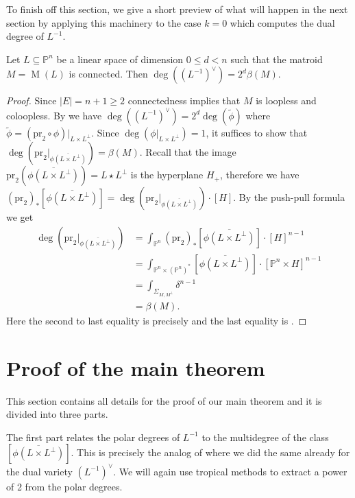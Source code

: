 \documentclass[12pt,a4paper,english]{scrartcl}
\newcommand{\PP}{\mathbb{P}}
\DeclareMathOperator{\Matroid}{M}
\begin{document}
To finish off this section, we give a short preview of what will happen in the next section by applying this machinery to the case $k=0$ which computes the dual degree of $L^{-1}$.
\begin{theorem}
\label{thm: dualdegrees}
    Let $L\subseteq \PP^n$ be a linear space of dimension $0\leq d<n$ such that the matroid $M=\Matroid(L)$ is connected. Then $\deg((L^{-1})^\vee)=2^d \beta(M)$.
\end{theorem}
\begin{proof}
    Since $|E|=n+1\geq 2$ connectedness implies that $M$ is loopless and coloopless.
    By  we have $\deg((L^{-1})^\vee)=2^d\deg(\widetilde{\phi})$ where $\widetilde{\phi}=(\text{pr}_2\circ \phi)|_{L\times L^\perp}$. Since $\deg (\phi|_{L\times L^\perp})=1$, it suffices to show that $\deg(\text{pr}_2|_{\overline{\phi(L\times L^\perp)}})=\beta(M)$. Recall that the image $\text{pr}_2(\overline{\phi(L\times L^\perp)})=L\star L^\perp$ is the hyperplane $H_+$, therefore we have $(\text{pr}_2)_*[\overline{\phi(L\times L^\perp)}]=\deg(\text{pr}_2|_{\overline{\phi(L\times L^\perp)}})\cdot[H]$. By the push-pull formula we get \begin{align*}
\deg(\text{pr}_2|_{\overline{\phi(L\times L^\perp)}})
        &=\int_{\PP^n}(\text{pr}_2)_*[\overline{\phi(L\times L^\perp)}] \cdot [H]^{n-1} \\
        &=\int_{\PP^n \times (\PP^n)^*}[\overline{\phi(L\times L^\perp)}]\cdot [\PP^n\times H]^{n-1}\\
        &=\int_{\Sigma_{M,M^\perp}}\delta^{n-1} \\
        &= \beta(M).
    \end{align*}
    Here the second to last equality is precisely  and the last equality is \cite[Proposition 4.9]{Ardila2022}.
\end{proof}



\section{Proof of the main theorem} \label{sec:triathlon}


This section contains all details for the proof of our main theorem and it is divided into three parts. 

The first part relates the polar degrees of $L^{-1}$ to the multidegree of the class $[\overline{\phi(L\times L^\perp)}]$. This is precisely the analog of  where we did the same already for the dual variety $(L^{-1})^\vee$. We will again use tropical methods to extract a power of 2 from the polar degrees.
\end{document}
